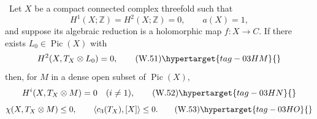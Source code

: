 \begin{theorem}
\hypertarget{tag-03J0}{}\label{wbII:thm:corrected-cdp-global}
\label{wbII:thm:corrected-global}
\ Let \(X\) be a compact connected complex threefold such that
\[
 H^1(X;\mathbb Z)=H^2(X;\mathbb Z)=0,\qquad a(X)=1,
\]
and suppose its algebraic reduction is a holomorphic map
\(f:X\to C\).  If there exists \(L_0\in\operatorname{Pic}(X)\) with
\[
 H^2(X,T_X\otimes L_0)=0,
\tag{W.51}\hypertarget{tag-03HM}{}\label{wbII:eq:W:5.24}
\]
then, for \(M\) in a dense open subset of \(\operatorname{Pic}(X)\),
\[
 H^i(X,T_X\otimes M)=0\quad(i\ne1),
\tag{W.52}\hypertarget{tag-03HN}{}\label{wbII:eq:W:5.25}
\]
\[
 \chi(X,T_X\otimes M)\le0,\qquad
 \left\langle c_3(T_X),[X]\right\rangle\le0.
\tag{W.53}\hypertarget{tag-03HO}{}\label{wbII:eq:W:5.26}
\]
\end{theorem}



